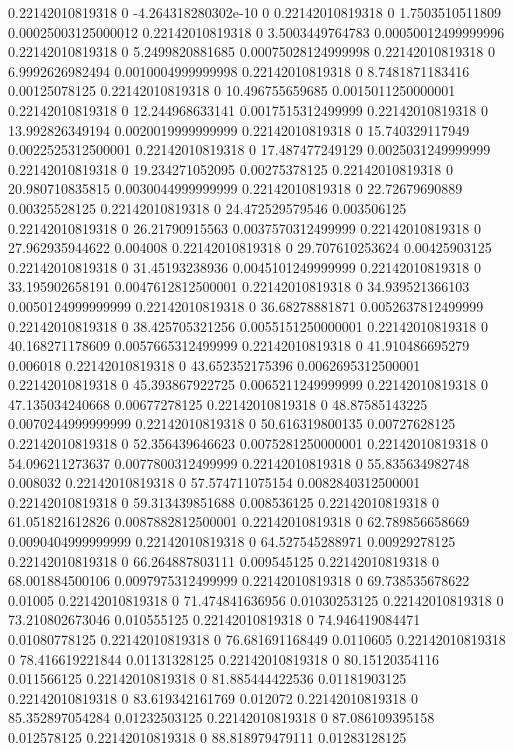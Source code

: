 0.22142010819318 0 -4.264318280302e-10 0
0.22142010819318 0 1.7503510511809 0.00025003125000012
0.22142010819318 0 3.5003449764783 0.00050012499999996
0.22142010819318 0 5.2499820881685 0.00075028124999998
0.22142010819318 0 6.9992626982494 0.0010004999999998
0.22142010819318 0 8.7481871183416 0.00125078125
0.22142010819318 0 10.496755659685 0.0015011250000001
0.22142010819318 0 12.244968633141 0.0017515312499999
0.22142010819318 0 13.992826349194 0.0020019999999999
0.22142010819318 0 15.740329117949 0.0022525312500001
0.22142010819318 0 17.487477249129 0.0025031249999999
0.22142010819318 0 19.234271052095 0.00275378125
0.22142010819318 0 20.980710835815 0.0030044999999999
0.22142010819318 0 22.72679690889 0.00325528125
0.22142010819318 0 24.472529579546 0.003506125
0.22142010819318 0 26.21790915563 0.0037570312499999
0.22142010819318 0 27.962935944622 0.004008
0.22142010819318 0 29.707610253624 0.00425903125
0.22142010819318 0 31.45193238936 0.0045101249999999
0.22142010819318 0 33.195902658191 0.0047612812500001
0.22142010819318 0 34.939521366103 0.0050124999999999
0.22142010819318 0 36.68278881871 0.0052637812499999
0.22142010819318 0 38.425705321256 0.0055151250000001
0.22142010819318 0 40.168271178609 0.0057665312499999
0.22142010819318 0 41.910486695279 0.006018
0.22142010819318 0 43.652352175396 0.0062695312500001
0.22142010819318 0 45.393867922725 0.0065211249999999
0.22142010819318 0 47.135034240668 0.00677278125
0.22142010819318 0 48.87585143225 0.0070244999999999
0.22142010819318 0 50.616319800135 0.00727628125
0.22142010819318 0 52.356439646623 0.0075281250000001
0.22142010819318 0 54.096211273637 0.0077800312499999
0.22142010819318 0 55.835634982748 0.008032
0.22142010819318 0 57.574711075154 0.0082840312500001
0.22142010819318 0 59.313439851688 0.008536125
0.22142010819318 0 61.051821612826 0.0087882812500001
0.22142010819318 0 62.789856658669 0.0090404999999999
0.22142010819318 0 64.527545288971 0.00929278125
0.22142010819318 0 66.264887803111 0.009545125
0.22142010819318 0 68.001884500106 0.0097975312499999
0.22142010819318 0 69.738535678622 0.01005
0.22142010819318 0 71.474841636956 0.01030253125
0.22142010819318 0 73.210802673046 0.010555125
0.22142010819318 0 74.946419084471 0.01080778125
0.22142010819318 0 76.681691168449 0.0110605
0.22142010819318 0 78.416619221844 0.01131328125
0.22142010819318 0 80.15120354116 0.011566125
0.22142010819318 0 81.885444422536 0.01181903125
0.22142010819318 0 83.619342161769 0.012072
0.22142010819318 0 85.352897054284 0.01232503125
0.22142010819318 0 87.086109395158 0.012578125
0.22142010819318 0 88.818979479111 0.01283128125
